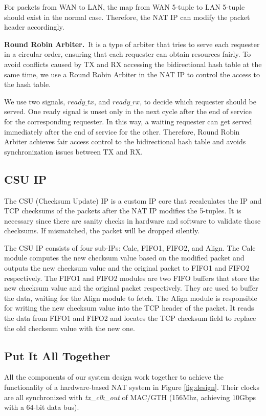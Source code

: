     For packets from WAN to LAN, the map from WAN 5-tuple to LAN 5-tuple should exist in the normal case. Therefore, the NAT IP can modify the packet header accordingly.

    \textbf{Round Robin Arbiter.}\ It is a type of arbiter that tries to serve each requester in a circular order, ensuring that each requester can obtain resources fairly. To avoid conflicts caused by TX and RX accessing the bidirectional hash table at the same time, we use a Round Robin Arbiter in the NAT IP to control the access to the hash table. 

    We use two signals, $ready\_tx$, and $ready\_rx$, to decide which requester should be served. One ready signal is unset only in the next cycle after the end of service for the corresponding requester. In this way, a waiting requester can get served immediately after the end of service for the other. Therefore, Round Robin Arbiter achieves fair access control to the bidirectional hash table and avoids synchronization issues between TX and RX.
    
\subsection{CSU IP}
    The CSU (Checksum Update) IP is a custom IP core that recalculates the IP and TCP checksums of the packets after the NAT IP modifies the 5-tuples. It is necessary since there are sanity checks in hardware and software to validate those checksums. If mismatched, the packet will be dropped silently. 
    
    The CSU IP consists of four sub-IPs: Calc, FIFO1, FIFO2, and Align. 
    The Calc module computes the new checksum value based on the modified packet and outputs the new checksum value and the original packet to FIFO1 and FIFO2 respectively.
    The FIFO1 and FIFO2 modules are two FIFO buffers that store the new checksum value and the original packet respectively. They are used to buffer the data, waiting for the Align module to fetch. 
    The Align module is responsible for writing the new checksum value into the TCP header of the packet. It reads the data from FIFO1 and FIFO2 and locates the TCP checksum field to replace the old checksum value with the new one.


\subsection{Put It All Together}

    All the components of our system design work together to achieve the functionality of a hardware-based NAT system in Figure \ref{fig:design}. Their clocks are all synchronized with \emph{tx\_clk\_out} of MAC/GTH (156Mhz, achieving 10Gbps with a 64-bit data bus).

